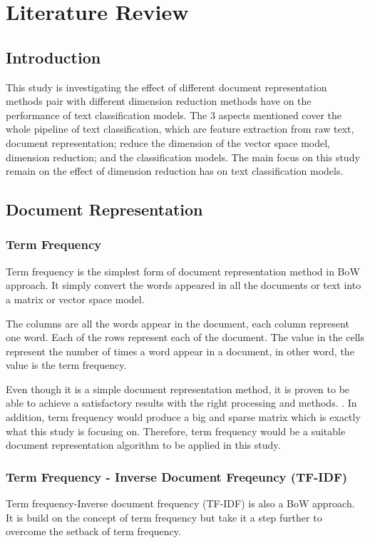 \chapter{Literature Review}
\section{Introduction}
This study is investigating the effect of different document representation methods pair with different dimension reduction methods have on the performance of text classification models. The 3 aspects mentioned cover the whole pipeline of text classification, which are feature extraction from raw text, document representation; reduce the dimension of the vector space model, dimension reduction; and the classification models. The main focus on this study remain on the effect of dimension reduction has on text classification models.\\

\section{Document Representation}
\subsection{Term Frequency}
Term frequency is the simplest form of document representation method in BoW approach. It simply convert the words appeared in all the documents or text into a matrix or vector space model.

The columns are all the words appear in the document, each column represent one word. Each of the rows represent each of the document. The value in the cells represent the number of times a word appear in a document, in other word, the value is the term frequency.

Even though it is a simple document representation method, it is proven to be able to achieve a satisfactory results with the right processing and methods. \cite{knnVectorSpaceReduction}. In addition, term frequency would produce a big and sparse matrix which is exactly what this study is focusing on. Therefore, term frequency would be a suitable document representation algorithm to be applied in this study.\\

\clearpage
\subsection{Term Frequency - Inverse Document Freqeuncy (TF-IDF)}
Term frequency-Inverse document frequency (TF-IDF) is also a BoW approach. It is build on the concept of term frequency but take it a step further to overcome the setback of term frequency. 

